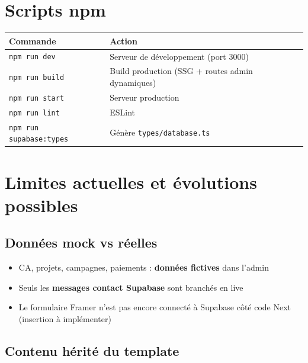 \documentclass[11pt,a4paper]{report}
\begin{document}
\chapter{Scripts npm}

\begin{table}[h]
\centering
\begin{tabular}{@{}lp{9cm}@{}}
\toprule
\textbf{Commande} & \textbf{Action} \\
\midrule
\texttt{npm run dev} & Serveur de développement (port 3000) \\
\texttt{npm run build} & Build production (SSG + routes admin dynamiques) \\
\texttt{npm run start} & Serveur production \\
\texttt{npm run lint} & ESLint \\
\texttt{npm run supabase:types} & Génère \texttt{types/database.ts} \\
\bottomrule
\end{tabular}
\end{table}

\chapter{Limites actuelles et évolutions possibles}

\section{Données mock vs réelles}

\begin{itemize}[leftmargin=*]
  \item CA, projets, campagnes, paiements : \textbf{données fictives} dans l'admin
  \item Seuls les \textbf{messages contact Supabase} sont branchés en live
  \item Le formulaire Framer n'est pas encore connecté à Supabase côté code Next (insertion à implémenter)
\end{itemize}

\section{Contenu hérité du template}
\end{document}
